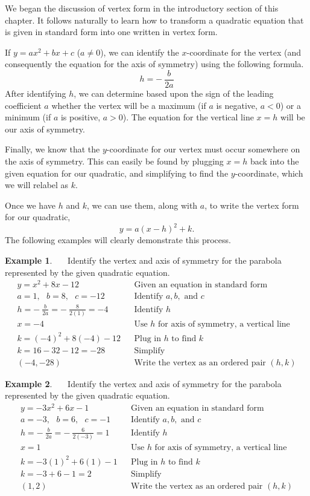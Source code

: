 \documentclass[12pt]{book}
\theoremstyle{definition}
\newtheorem{example}{Example}
\begin{document}
We began the discussion of vertex form in the introductory section of this chapter. It follows naturally to learn how to transform a quadratic equation that is given in standard form into one written in vertex form.\par
If $y=ax^2+bx+c$ ($a\neq0$), we can identify the $x$-coordinate for the vertex (and consequently the equation for the axis of symmetry) using the following formula.
$$h=-~\frac{b}{2a}$$ 
After identifying $h$, we can determine based upon the sign of the leading coefficient $a$ whether the vertex will be a maximum (if $a$ is negative, $a<0$) or a minimum (if $a$ is positive, $a>0$).  The equation for the vertical line $x=h$ will be our axis of symmetry.\par
Finally, we know that the $y$-coordinate for our vertex must occur somewhere on the axis of symmetry.  This can easily be found by plugging $x=h$ back into the given equation for our quadratic, and simplifying to find the $y$-coordinate, which we will relabel as $k$.\par
Once we have $h$ and $k$, we can use them, along with $a$, to write the vertex form for our quadratic, $$y=a(x-h)^2+k.$$%
The following examples will clearly demonstrate this process.
\newpage
\begin{example}~~~Identify the vertex and axis of symmetry for the parabola represented by the given quadratic equation.
\begin{eqnarray*}
y=x^2+8x-12       &  & \text{Given an equation in standard form}\\              
a=1,~~~b=8,~~~c=-12       &  & \text{Identify~} a,b, \text{~and~} c\\             
h=-~\frac{b}{2a}=-~\frac{8}{2(1)}=-4 & & \text{Identify~} h\\
x=-4 & & \text{Use~} h \text{~for~axis~of~symmetry,~a~vertical~line}\\
k= (-4)^2+8(-4)-12   &  & \text{Plug in~} h \text{~to~find~} k\\
k= 16-32-12= -28  &  &\mathrm{Simplify}\\
(-4,-28)    &  & \text{Write the vertex as an ordered pair $(h,k)$}
\end{eqnarray*}
\end{example}
\begin{example}~~~Identify the vertex and axis of symmetry for the parabola represented by the given quadratic equation.
\begin{eqnarray*}
y=-3x^2+6x-1      &  &\text{Given an equation in standard form}\\              
a=-3,~~~b=6,~~~c=-1       &  & \text{Identify~} a,b, \text{~and~} c\\             
h=-~\frac{b}{2a}=-~\frac{6}{2(-3)}=1 & & \text{Identify~} h\\
x=1 & & \text{Use~} h \text{~for~axis~of~symmetry,~a~vertical~line}\\
k= -3(1)^2+6(1)-1   &  & \text{Plug in~} h \text{~to~find~} k\\
k= -3+6-1= 2  &  &\mathrm{Simplify}\\
(1,2)    &  & \text{Write the vertex as an ordered pair $(h,k)$}
\end{eqnarray*}
\end{example}
\end{document}
